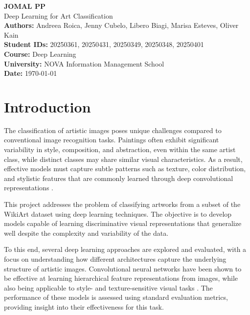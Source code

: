 \documentclass[12pt,a4paper]{article}
\begin{document}
\begin{titlepage}
    \centering
    \vspace*{3cm}
    
    {\LARGE \textbf{JOMAL PP}}\\[0.5cm]
    {\large Deep Learning for Art Classification}\\[10cm]
    
    \textbf{Authors:} Andreea Roica, Jenny Cubelo, Libero Biagi, Marisa Esteves, Oliver Kain \\
    \textbf{Student IDs:} 20250361, 20250431, 20250349, 20250348, 20250401 \\
    \textbf{Course:} Deep Learning \\
    \textbf{University:} NOVA Information Management School \\
    \textbf{Date:} \today
    
    \vfill
\end{titlepage}

\tableofcontents
\newpage

\section{Introduction}

The classification of artistic images poses unique challenges compared to conventional image recognition tasks. Paintings often exhibit significant variability in style, composition, and abstraction, even within the same artist class, while distinct classes may share similar visual characteristics. As a result, effective models must capture subtle patterns such as texture, color distribution, and stylistic features that are commonly learned through deep convolutional representations \cite{krizhevsky2012,gatys2016}.

This project addresses the problem of classifying artworks from a subset of the WikiArt dataset using deep learning techniques. The objective is to develop models capable of learning discriminative visual representations that generalize well despite the complexity and variability of the data.

To this end, several deep learning approaches are explored and evaluated, with a focus on understanding how different architectures capture the underlying structure of artistic images. Convolutional neural networks have been shown to be effective at learning hierarchical feature representations from images, while also being applicable to style- and texture-sensitive visual tasks \cite{gatys2016}. The performance of these models is assessed using standard evaluation metrics, providing insight into their effectiveness for this task.
\end{document}
